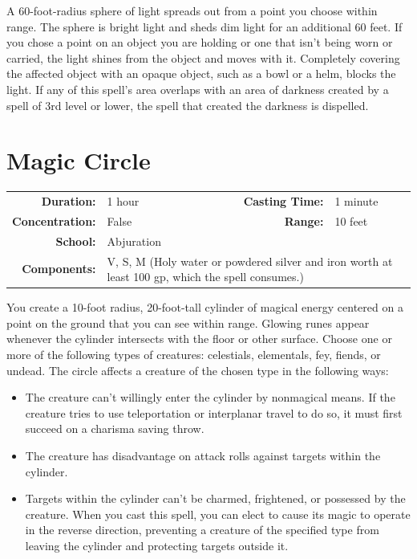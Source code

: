 \documentclass[12pt,showtrims]{memoir}
\begin{document}
\vspace{1\baselineskip}\noindent A 60-foot-radius sphere of light spreads out from a point you choose within range. The sphere is bright light and sheds dim light for an additional 60 feet. If you chose a point on an object you are holding or one that isn't being worn or carried, the light shines from the object and moves with it. Completely covering the affected object with an opaque object, such as a bowl or a helm, blocks the light. If any of this spell's area overlaps with an area of darkness created by a spell of 3rd level or lower, the spell that created the darkness is dispelled.

\newpage
\section*{Magic Circle}

{
\small\centering\vspace{-6pt}
\begin{tabular}{rlrl}
\toprule

\textbf{Duration:} & 1 hour &
\textbf{Casting Time:} & 1 minute \\
\textbf{Concentration:} & False &
\textbf{Range:} & 10 feet \\
\textbf{School:} & Abjuration \\
\textbf{Components:} & \multicolumn{3}{p{0.7\textwidth}}{V, S, M (Holy water or powdered silver and iron worth at least 100 gp, which the spell consumes.)}\\

\bottomrule
\end{tabular}
}

\vspace{1\baselineskip}\noindent You create a 10-foot radius, 20-foot-tall cylinder of magical energy centered on a point on the ground that you can see within range. Glowing runes appear whenever the cylinder intersects with the floor or other surface. Choose one or more of the following types of creatures: celestials, elementals, fey, fiends, or undead. The circle affects a creature of the chosen type in the following ways:
\begin{itemize}
    \item The creature can't willingly enter the cylinder by nonmagical means. If the creature tries to use teleportation or interplanar travel to do so, it must first succeed on a charisma saving throw.
    \item The creature has disadvantage on attack rolls against targets within the cylinder.
    \item Targets within the cylinder can't be charmed, frightened, or possessed by the creature. When you cast this spell, you can elect to cause its magic to operate in the reverse direction, preventing a creature of the specified type from leaving the cylinder and protecting targets outside it.
\end{itemize}
\end{document}
